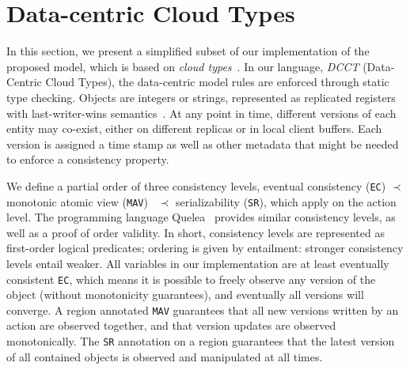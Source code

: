 \documentclass[numbers]{sigplanconf}
\begin{document}
%


\section{Data-centric Cloud Types}
\label{sec:example}
In this section, we present a simplified subset of our implementation of the
proposed model, which is based on \emph{cloud
types}~\cite{burckhardt2012cloud}. In our language, \emph{DCCT} (Data-Centric
Cloud Types), the data-centric model rules are enforced through static type 
checking. Objects are integers or strings,
represented as replicated registers with last-writer-wins
semantics~\cite{burckhardt2014replicated}. At any point in time, different
versions of each entity may co-exist, either on different replicas or in local 
client buffers. Each version is assigned a time stamp as well as other metadata 
that might be needed to enforce a consistency property.

We define a partial order of three consistency levels, eventual
consistency (\texttt{EC}) $\prec$ monotonic atomic view (\texttt{MAV})~\cite{bailis2013highly}  $\prec$
serializability (\texttt{SR}), which apply on the action level. The programming language 
Quelea~\cite{sivaramakrishnan2015declarative} provides similar
consistency levels, as well as a proof of order validity. In short, consistency
levels are represented as first-order logical predicates; ordering is given
by entailment: stronger consistency levels entail weaker.
All variables in our implementation are at least eventually consistent
\texttt{EC}, which means it
is possible to freely observe any version of the object (without monotonicity
guarantees), and
eventually all versions will converge. A region annotated \texttt{MAV}
guarantees that all new versions written by an
action are observed together, and that version updates are observed
monotonically. The \texttt{SR} annotation on a
region guarantees that the latest version of all
contained objects is observed and manipulated at all times. 
\end{document}
